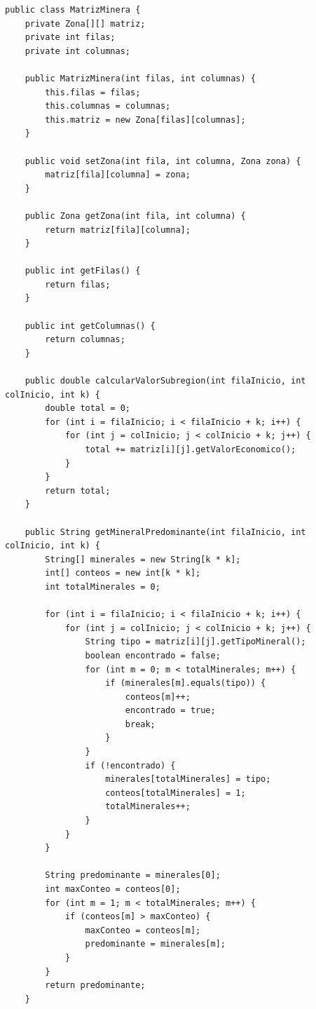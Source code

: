 \documentclass[12pt]{article}
\begin{document}
\begin{verbatim}
public class MatrizMinera {
    private Zona[][] matriz;
    private int filas;
    private int columnas;

    public MatrizMinera(int filas, int columnas) {
        this.filas = filas;
        this.columnas = columnas;
        this.matriz = new Zona[filas][columnas];
    }

    public void setZona(int fila, int columna, Zona zona) {
        matriz[fila][columna] = zona;
    }

    public Zona getZona(int fila, int columna) {
        return matriz[fila][columna];
    }

    public int getFilas() {
        return filas;
    }

    public int getColumnas() {
        return columnas;
    }

    public double calcularValorSubregion(int filaInicio, int colInicio, int k) {
        double total = 0;
        for (int i = filaInicio; i < filaInicio + k; i++) {
            for (int j = colInicio; j < colInicio + k; j++) {
                total += matriz[i][j].getValorEconomico();
            }
        }
        return total;
    }

    public String getMineralPredominante(int filaInicio, int colInicio, int k) {
        String[] minerales = new String[k * k];
        int[] conteos = new int[k * k];
        int totalMinerales = 0;

        for (int i = filaInicio; i < filaInicio + k; i++) {
            for (int j = colInicio; j < colInicio + k; j++) {
                String tipo = matriz[i][j].getTipoMineral();
                boolean encontrado = false;
                for (int m = 0; m < totalMinerales; m++) {
                    if (minerales[m].equals(tipo)) {
                        conteos[m]++;
                        encontrado = true;
                        break;
                    }
                }
                if (!encontrado) {
                    minerales[totalMinerales] = tipo;
                    conteos[totalMinerales] = 1;
                    totalMinerales++;
                }
            }
        }

        String predominante = minerales[0];
        int maxConteo = conteos[0];
        for (int m = 1; m < totalMinerales; m++) {
            if (conteos[m] > maxConteo) {
                maxConteo = conteos[m];
                predominante = minerales[m];
            }
        }
        return predominante;
    }


\end{verbatim}
\end{document}

